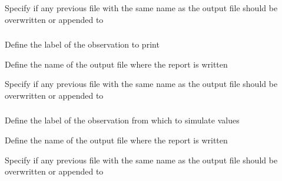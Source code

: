  {Specify if any previous file with the same name as the output file should be overwritten or appended to}

\subsubsection[Print a summary of the an observation, including fits, and residuals]{}

 {Define the label of the observation to print}

 {Define the name of the output file where the report is written}

 {Specify if any previous file with the same name as the output file should be overwritten or appended to}

\subsubsection[Print a observation using simulated values]{}

 {Define the label of the observation from which to simulate values}

 {Define the name of the output file where the report is written}

 {Specify if any previous file with the same name as the output file should be overwritten or appended to}

\subsubsection[Print an ageing error misclassification matrix]{}

